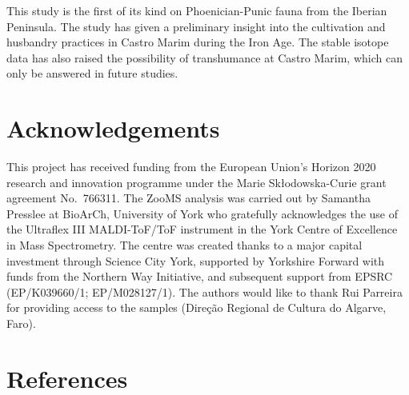 \documentclass[3p]{elsarticle} %
\begin{document}
This study is the first of its kind on Phoenician-Punic fauna from the Iberian Peninsula. The study has given a preliminary insight into the cultivation and husbandry practices in Castro Marim during the Iron Age. The stable isotope data has also raised the possibility of transhumance at Castro Marim, which can only be answered in future studies.

\hypertarget{acknowledgements}{%
\section{Acknowledgements}\label{acknowledgements}}

This project has received funding from the European Union's Horizon 2020 research and innovation programme under the Marie Skłodowska-Curie grant agreement No.~766311. The ZooMS analysis was carried out by Samantha Presslee at BioArCh, University of York who gratefully acknowledges the use of the Ultraflex III MALDI-ToF/ToF instrument in the York Centre of Excellence in Mass Spectrometry. The centre was created thanks to a major capital investment through Science City York, supported by Yorkshire Forward with funds from the Northern Way Initiative, and subsequent support from EPSRC (EP/K039660/1; EP/M028127/1). The authors would like to thank Rui Parreira for providing access to the samples (Direção Regional de Cultura do Algarve, Faro).

\hypertarget{references}{%
\section*{References}\label{references}}
\end{document}
